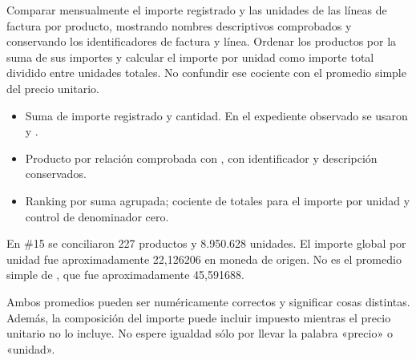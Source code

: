 \label{wwi03}
\begin{goal}
Comparar mensualmente el importe registrado y las unidades de las líneas de factura por producto, mostrando nombres descriptivos comprobados y conservando los identificadores de factura y línea. Ordenar los productos por la suma de sus importes y calcular el importe por unidad como importe total dividido entre unidades totales. No confundir ese cociente con el promedio simple del precio unitario.
\end{goal}
\begin{itemize}
\item Suma de importe registrado y cantidad. En el expediente observado se usaron  y .
\item Producto por relación comprobada con , con identificador y descripción conservados.
\item Ranking por suma agrupada; cociente de totales para el importe por unidad y control de denominador cero.
\end{itemize}
\begin{good}
En \#15 se conciliaron 227 productos y 8.950.628 unidades. El importe global por unidad fue aproximadamente 22,126206 en moneda de origen. No es el promedio simple de , que fue aproximadamente 45,591688.
\end{good}
\begin{note}
Ambos promedios pueden ser numéricamente correctos y significar cosas distintas. Además, la composición del importe puede incluir impuesto mientras el precio unitario no lo incluye. No espere igualdad sólo por llevar la palabra «precio» o «unidad».
\end{note}

